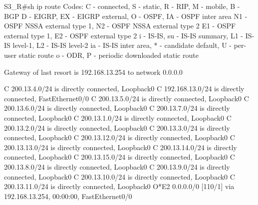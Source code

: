 \documentclass[10pt]{article}
\begin{document}
\begin{itemize}
\begin{verbatim*}
		S3_R#sh ip route
		Codes: C - connected, S - static, R - RIP, M - mobile, B - BGP
		       D - EIGRP, EX - EIGRP external, O - OSPF, IA - OSPF inter area
		       N1 - OSPF NSSA external type 1, N2 - OSPF NSSA external type 2
		       E1 - OSPF external type 1, E2 - OSPF external type 2
		       i - IS-IS, su - IS-IS summary, L1 - IS-IS level-1, L2 - IS-IS level-2
		       ia - IS-IS inter area, * - candidate default, U - per-user static route
		       o - ODR, P - periodic downloaded static route

		Gateway of last resort is 192.168.13.254 to network 0.0.0.0

		C    200.13.4.0/24 is directly connected, Loopback0
		C    192.168.13.0/24 is directly connected, FastEthernet0/0
		C    200.13.5.0/24 is directly connected, Loopback0
		C    200.13.6.0/24 is directly connected, Loopback0
		C    200.13.7.0/24 is directly connected, Loopback0
		C    200.13.1.0/24 is directly connected, Loopback0
		C    200.13.2.0/24 is directly connected, Loopback0
		C    200.13.3.0/24 is directly connected, Loopback0
		C    200.13.12.0/24 is directly connected, Loopback0
		C    200.13.13.0/24 is directly connected, Loopback0
		C    200.13.14.0/24 is directly connected, Loopback0
		C    200.13.15.0/24 is directly connected, Loopback0
		C    200.13.8.0/24 is directly connected, Loopback0
		C    200.13.9.0/24 is directly connected, Loopback0
		C    200.13.10.0/24 is directly connected, Loopback0
		C    200.13.11.0/24 is directly connected, Loopback0
		O*E2 0.0.0.0/0 [110/1] via 192.168.13.254, 00:00:00, FastEthernet0/0
	\end{verbatim*}
\end{itemize}
\end{document}
